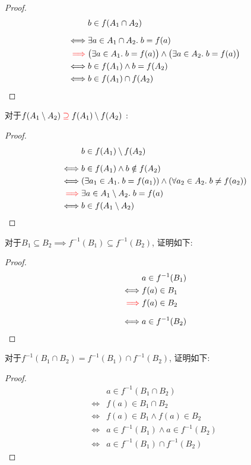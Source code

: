 \begin{proof}
  \setcounter{equation}{0}
  \begin{align*}
    &b \in f(A_1 \cap A_2) \\[6pt]
    \iff & \exists a \in A_1 \cap A_2.\; b = f(a) \\
    \textcolor{red}{\implies}& \big(\exists a \in A_{1}.\; b = f(a)\big)
      \land \big(\exists a \in A_{2}.\; b = f(a)\big) \\
    \iff & b \in f(A_{1}) \land b = f(A_{2}) \\
    \iff & b \in f(A_1) \cap f(A_2)
  \end{align*}
\end{proof}

对于$f(A_1 \setminus A_2) \textcolor{red}{\;\supseteq\;} f(A_1) \setminus f(A_2)$ : 

\begin{proof}
  \setcounter{equation}{0}
  \begin{align*}
    &b \in f(A_{1}) \setminus f(A_{2}) \\[6pt]
    \iff & b \in f(A_{1}) \land b \notin f(A_{2}) \\
    \iff & (\exists a_{1} \in A_{1}.\; b = f(a_{1})) \land
      (\forall a_{2} \in A_{2}.\; b \neq f(a_{2})) \\
    \textcolor{red}{\implies} & \exists a \in A_{1} \setminus A_{2}.\; b = f(a) \\
    \iff & b \in f(A_{1} \setminus A_{2})
  \end{align*}
\end{proof}

对于$B_1 \subseteq B_2 \implies f^{-1}(B_1) \subseteq f^{-1}(B_2)$, 证明如下:

\begin{proof}
  \setcounter{equation}{0}
  \begin{align*}
    &a \in f^{-1}(B_{1}) \\
    \iff & f(a) \in B_{1} \\
    \textcolor{red}{\implies} & f(a) \in B_{2} \\[6pt]
    \iff & a \in f^{-1}(B_{2})
  \end{align*}
\end{proof}

对于$f^{-1}(B_1 \cap B_2) = f^{-1}(B_1) \cap f^{-1}(B_2)$, 证明如下: 

\begin{proof}
  \setcounter{equation}{0}
  \begin{align*}
    &a \in f^{-1}(B_{1} \cap B_{2}) \\
    \iff & f(a) \in B_{1} \cap B_{2} \\
    \iff & f(a) \in B_{1} \land f(a) \in B_{2} \\
    \iff & a \in f^{-1}(B_{1}) \land a \in f^{-1}(B_{2}) \\
    \iff & a \in f^{-1}(B_{1}) \cap f^{-1}(B_{2})
  \end{align*}
\end{proof}

